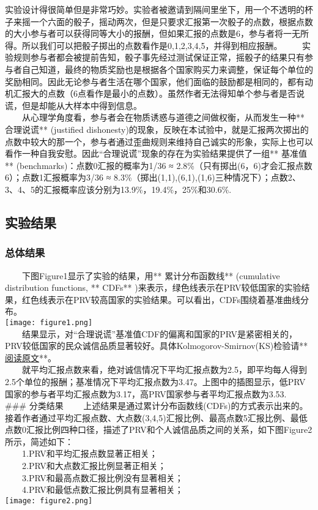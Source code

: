 \documentclass[11pt]{article}
\makeatletter
\def\maxwidth{\ifdim\Gin@nat@width>\linewidth\linewidth
    \else\Gin@nat@width\fi}
\let\Oldincludegraphics\includegraphics
\renewcommand{\includegraphics}[1]{\Oldincludegraphics[width=.8\maxwidth]{#1}}
\makeatother
\begin{document}
    实验设计得很简单但是非常巧妙。实验者被邀请到隔间里坐下，用一个不透明的杯子来摇一个六面的骰子，摇动两次，但是只要求汇报第一次骰子的点数，根据点数的大小参与者可以获得同等大小的报酬，但如果汇报的点数是6，参与者将一无所得。所以我们可以把骰子掷出的点数看作是0,1,2,3,4,5，并得到相应报酬。
　　实验规则参与者都会被提前告知，骰子事先经过测试保证正常，摇骰子的结果只有参与者自己知道，最终的物质奖励也是根据各个国家购买力来调整，保证每个单位的奖励相同。因此无论参与者生活在哪个国家，他们面临的鼓励都是相同的，都有动机汇报大的点数（6点看作是最小的点数）。虽然作者无法得知单个参与者是否说谎，但是却能从大样本中得到信息。\\
　　从心理学角度看，参与者会在物质诱惑与道德之间做权衡，从而发生一种**
合理说谎** (justified
dishonesty)的现象，反映在本试验中，就是汇报两次掷出的点数中较大的那一个，参与者通过歪曲规则来维持自己诚实的形象，实际上也可以看作一种自我安慰。因此``合理说谎''现象的存在为实验结果提供了一组**
基准值** (benchmarks)：点数0汇报的概率为1/36 ≈
2.8\%（只有掷出(6，6)才会汇报点数6）；点数1汇报概率为3/36 ≈
8.3\%（掷出(1,1),(6,1),(1,6)三种情况下）；点数2、3、4、5的汇报概率应该分别为13.9\%，19.4\%，25\%和30.6\%.

    \subsection{实验结果}\label{ux5b9eux9a8cux7ed3ux679c}

    \subsubsection{总体结果}\label{ux603bux4f53ux7ed3ux679c}

　　下图Figure1显示了实验的结果，用** 累计分布函数线** (cumulative
distribution functions, ** CDFs**
)来表示，绿色线表示在PRV较低国家的实验结果，红色线表示在PRV较高国家的实验结果。可以看出，CDFs围绕着基准曲线分布。\\
\texttt{[image: figure1.png]}\\
　　结果显示，对``合理说谎''基准值CDF的偏离和国家的PRV是紧密相关的，PRV较低国家的民众诚信品质显著较好。具体Kolmogorov-Smirnov(KS)检验请**
\href{http://files.meetup.com/19659955/CorruptionCorrupts_MainArticle_nature17160.pdf}{阅读原文}**。\\
　　就平均汇报点数来看，绝对诚信情况下平均汇报点数为2.5，即平均每人得到2.5个单位的报酬；基准情况下平均汇报点数为3.47。上图中的插图显示，低PRV国家的参与者平均汇报点数为3.17，高PRV国家参与者平均汇报点数为3.53.\\
\#\#\# 分类结果
　　上述结果是通过累计分布函数线(CDFs)的方式表示出来的。接着作者通过平均汇报点数、大点数(3,4,5)汇报比例、最高点数5汇报比例、最低点数0汇报比例四种口径，描述了PRV和个人诚信品质之间的关系，如下图Figure2所示，简述如下：\\
　　1.PRV和平均汇报点数显著正相关；\\
　　2.PRV和大点数汇报比例显著正相关；\\
　　3.PRV和最高点数汇报比例没有显著相关；\\
　　4.PRV和最低点数汇报比例具有显著相关；\\
\texttt{[image: figure2.png]}
\end{document}
